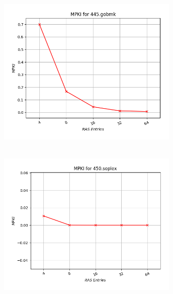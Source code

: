    \begin{minipage}{\textwidth}
      \begin{center}
         \\
         \vspace{3mm}
         \includegraphics[width=0.65\textwidth, frame]{./graphs/4-4/445-gobmk.png}
         \vspace{6mm}
      \end{center}
   \end{minipage}

   \begin{minipage}{\textwidth}
      \begin{center}
         \\
         \vspace{3mm}
         \includegraphics[width=0.65\textwidth, frame]{./graphs/4-4/450-soplex.png}
         \vspace{6mm}
      \end{center}
   \end{minipage}

